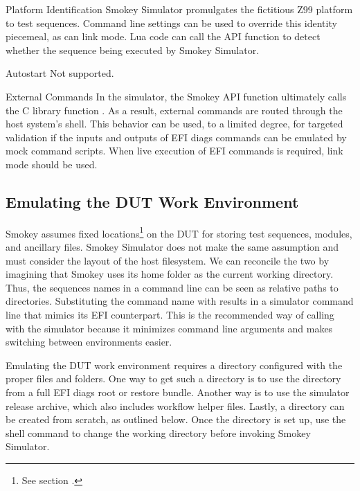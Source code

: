 \begin{Definition}
\item[Platform Identification] Smokey Simulator promulgates the fictitious Z99
platform to test sequences.  Command line settings can be used to override this
identity piecemeal, as can link mode.  Lua code can call the
 API function to detect whether the
sequence being executed by Smokey Simulator.

\item[Autostart] Not supported.

\item[External Commands] In the simulator, the Smokey API function 
ultimately calls the C library function .  As a result, external
commands are routed through the host system's shell.  This behavior can be
used, to a limited degree, for targeted validation if the inputs and outputs of
EFI diags commands can be emulated by mock command scripts.  When live
execution of EFI commands is required, link mode should be used.

\end{Definition}

\subsection{Emulating the DUT Work Environment}

Smokey assumes fixed locations\footnote{See section
.} on the DUT for storing test sequences, modules,
and ancillary files.  Smokey Simulator does not make the same assumption and
must consider the layout of the host filesystem.  We can reconcile the two by
imagining that Smokey uses its home folder as the current working directory.
Thus, the sequences names in a  command line can be seen as
relative paths to directories.  Substituting the  command name
with  results in a simulator command line that mimics
its EFI counterpart.  This is the recommended way of calling with the simulator
because it minimizes command line arguments and makes switching between
environments easier.

Emulating the DUT work environment requires a directory configured with the
proper files and folders.  One way to get such a directory is to use the
 directory from a full EFI diags root or restore bundle.
Another way is to use the simulator release archive, which also includes
workflow helper files.  Lastly, a directory can be created from scratch, as
outlined below.  Once the directory is set up, use the shell 
command to change the working directory before invoking Smokey Simulator.

